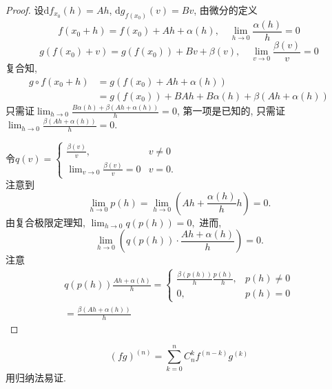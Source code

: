 \begin{proof}
    设$\mathrm{d} f_{x_0}\left( h \right) = Ah$, $\mathrm{d} g_{f\left( x_0 \right) } \left( v \right) = Bv$, 由微分的定义
    \begin{equation}
      f\left( x_0 + h \right) = f\left( x_0 \right) + Ah + \alpha\left( h \right) ,\quad \lim_{h \to 0} \frac{\alpha\left( h \right) }{h} = 0
    \end{equation}
    \begin{equation}
      g \left( f\left( x_0 \right) + v \right) = g\left( f\left( x_0 \right) \right) + Bv + \beta\left( v \right) ,\quad \lim_{v \to 0} \frac{\beta\left( v \right) }{v} = 0
    \end{equation}
    复合知, 
    \begin{equation}
        \begin{aligned}
            g\circ f \left( x_0 + h \right) & = g \left( f\left( x_0 \right) + Ah + \alpha\left( h \right)  \right) 
            \\
            & = g\left( f\left( x_0 \right) \right) + BAh + B\alpha\left( h \right) + \beta\left( Ah + \alpha\left( h \right)  \right)
        \end{aligned}
    \end{equation}
    只需证$\displaystyle \lim_{h \to 0} \frac{B \alpha \left( h \right) + \beta \left( Ah + \alpha\left( h \right)  \right) }{h} = 0$, 第一项是已知的, 只需证$\displaystyle \lim_{h \to 0} \frac{\beta \left( Ah + \alpha(h) \right) }{h} = 0$.
    
    令$q \left( v \right) = 
    \begin{cases}
        \frac{\beta(v)}{v}, & v\neq 0
        \\
        \lim_{v \to 0} \frac{\beta(v)}{v} = 0 & v = 0.
    \end{cases}$
    \\注意到
    \begin{equation}
      \lim_{h \to 0} p(h) = \lim_{h \to 0} \left( Ah + \frac{\alpha(h)}{h} h \right) = 0.
    \end{equation}
    由复合极限定理知, $\displaystyle \lim_{h \to 0} q\left( p\left( h \right)  \right) = 0,$
    进而, 
    \begin{equation}
      \lim_{h \to 0} \left( q(p(h)) \cdot \frac{Ah + \alpha\left( h \right) }{h} \right) = 0. 
    \end{equation}
    注意
    \begin{equation}
        \begin{gathered}
            q(p(h)) \frac{Ah + \alpha(h)}{h} = \begin{cases} 
                \frac{\beta\left( p(h) \right) }{h} \frac{p(h)}{h}, & p(h) \neq 0  
                \\ 
                0, & p(h) = 0  
              \end{cases}
              \\
              = \frac{\beta\left( Ah + \alpha(h) \right) }{h}
        \end{gathered}
    \end{equation}
\end{proof}

\begin{proposition}[Leibniz法则]
    \begin{equation}
      \left( fg \right) ^{(n)} = \sum_{k=0}^{n} C_{n}^{k} f^{(n-k)} g^{(k)}
    \end{equation}
    用归纳法易证.
\end{proposition}